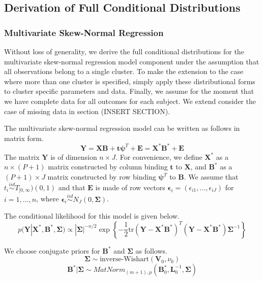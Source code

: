 \documentclass[useAMS,referee]{biom}
\newcommand{\tr}{\mbox{tr}}
\begin{document}
\newpage
\subsection{Derivation of Full Conditional Distributions}

\subsubsection{Multivariate Skew-Normal Regression}

Without loss of generality, we derive the full conditional distributions for the multivariate skew-normal regression model component under the assumption that all observations belong to a single cluster. To make the extension to the case where more than one cluster is specified, simply apply these distributional forms to cluster specific parameters and data. Finally, we assume for the moment that we have complete data for all outcomes for each subject. We extend consider the case of missing data in section (INSERT SECTION).

The multivariate skew-normal regression model can be written as follows in matrix form. 
$$\mathbf{Y} = \mathbf{X}\mathbf{B} + \mathbf{t} \boldsymbol\psi^T + \mathbf{E} = \mathbf{X}^* \mathbf{B}^* + \mathbf{E}$$
The matrix $\mathbf{Y}$ is of dimension $n \times J$. For convenience, we define $\mathbf{X}^*$ as a $n \times (P + 1)$ matrix constructed by column binding $\mathbf{t}$ to $\mathbf{X}$, and $\mathbf{B}^*$ as a $(P+1) \times J$ matrix constructed by row binding $\boldsymbol\psi^T$ to $\mathbf{B}$. We assume that $t_i \stackrel{iid}{\sim}T_{[0,\infty})(0,1)$ and that $\mathbf{E}$ is made of row vectors $\boldsymbol\epsilon_i = (\epsilon_{i1},...,\epsilon_{iJ})$ for $i = 1,...,n$, where $ \boldsymbol\epsilon_i \stackrel{iid}{\sim} N_J(0, \boldsymbol\Sigma)$.

The conditional likelihood for this model is given below. 
$$p(\mathbf{Y}|\mathbf{X}^*,\mathbf{B}^*,\boldsymbol\Sigma) \propto |\boldsymbol\Sigma|^{-n/2}\exp \left \{ -\frac{1}{2} \tr(\mathbf{Y} - \mathbf{X}^* \mathbf{B}^*)^T(\mathbf{Y} - \mathbf{X}^* \mathbf{B}^*)\boldsymbol\Sigma^{-1} \right \}$$

We choose conjugate priors for $\mathbf{B}^*$ and $\boldsymbol\Sigma$ as follows. 
$$\boldsymbol\Sigma \sim \text{inverse-Wishart}(\mathbf{V}_0,\nu_0)$$
$$\mathbf{B}^*|\boldsymbol\Sigma \sim MatNorm_{(m+1), p}(\mathbf{B}_0^*,\mathbf{L}_0^{-1},\boldsymbol\Sigma)$$
\end{document}
